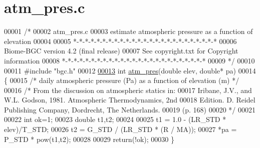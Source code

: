 \hypertarget{atm__pres_8c_source}{}\section{atm\+\_\+pres.\+c}
\label{atm__pres_8c_source}

\begin{DoxyCode}
00001 \textcolor{comment}{/* }
00002 \textcolor{comment}{atm\_pres.c}
00003 \textcolor{comment}{estimate atmospheric pressure as a function of elevation}
00004 \textcolor{comment}{}
00005 \textcolor{comment}{*-*-*-*-*-*-*-*-*-*-*-*-*-*-*-*-*-*-*-*-*-*-*-*-*}
00006 \textcolor{comment}{Biome-BGC version 4.2 (final release)}
00007 \textcolor{comment}{See copyright.txt for Copyright information}
00008 \textcolor{comment}{*-*-*-*-*-*-*-*-*-*-*-*-*-*-*-*-*-*-*-*-*-*-*-*-*}
00009 \textcolor{comment}{*/}
00010 
00011 \textcolor{preprocessor}{#include "bgc.h"}
00012 
\hypertarget{atm__pres_8c_source_l00013}{}\hyperlink{atm__pres_8c_a30d2b9ec7344a16b2cd045cfe92995e2}{00013} \textcolor{keywordtype}{int} \hyperlink{atm__pres_8c_a30d2b9ec7344a16b2cd045cfe92995e2}{atm\_pres}(\textcolor{keywordtype}{double} elev, \textcolor{keywordtype}{double}* pa)
00014 \{
00015     \textcolor{comment}{/* daily atmospheric pressure (Pa) as a function of elevation (m) */}
00016     \textcolor{comment}{/* From the discussion on atmospheric statics in:}
00017 \textcolor{comment}{    Iribane, J.V., and W.L. Godson, 1981. Atmospheric Thermodynamics, 2nd}
00018 \textcolor{comment}{        Edition. D. Reidel Publishing Company, Dordrecht, The Netherlands.}
00019 \textcolor{comment}{        (p. 168)}
00020 \textcolor{comment}{    */}
00021     
00022     \textcolor{keywordtype}{int} ok=1;
00023     \textcolor{keywordtype}{double} t1,t2;
00024     
00025     t1 = 1.0 - (LR\_STD * elev)/T\_STD;
00026     t2 = G\_STD / (LR\_STD * (R / MA));
00027     *pa = P\_STD * pow(t1,t2);
00028     
00029     \textcolor{keywordflow}{return}(!ok);
00030 \}
\end{DoxyCode}
